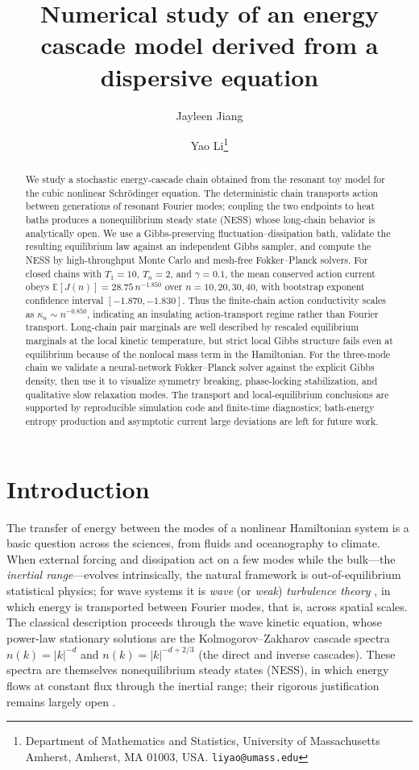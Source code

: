 \documentclass[11pt,a4paper]{article}
\title{Numerical study of an energy cascade model derived from a dispersive equation}
\author{Jayleen Jiang \and Yao Li\thanks{Department of Mathematics and Statistics, University of Massachusetts Amherst, Amherst, MA 01003, USA. \texttt{liyao@umass.edu}}}
\date{}
\theoremstyle{definition}
\newcommand{\E}{\mathbb{E}}
\numberwithin{equation}{section}   %
\begin{document}
\maketitle

\begin{abstract}
We study a stochastic energy-cascade chain obtained from the resonant toy model
for the cubic nonlinear Schr\"odinger equation. The deterministic chain
transports action between generations of resonant Fourier modes; coupling the
two endpoints to heat baths produces a nonequilibrium steady state (NESS) whose
long-chain behavior is analytically open. We use a Gibbs-preserving
fluctuation--dissipation bath, validate the resulting equilibrium law against
an independent Gibbs sampler, and compute the NESS by high-throughput Monte
Carlo and mesh-free Fokker--Planck solvers. For closed chains with
$T_1=10$, $T_n=2$, and $\gamma=0.1$, the mean conserved action current obeys
$\E[J(n)]=28.75\,n^{-1.850}$ over $n=10,20,30,40$, with bootstrap exponent
confidence interval $[-1.870,-1.830]$. Thus the finite-chain action
conductivity scales as $\kappa_n\sim n^{-0.850}$, indicating an insulating
action-transport regime rather than Fourier transport. Long-chain pair
marginals are well described by rescaled equilibrium marginals at the local
kinetic temperature, but strict local Gibbs structure fails even at
equilibrium because of the nonlocal mass term in the Hamiltonian. For the
three-mode chain we validate a neural-network Fokker--Planck solver against the
explicit Gibbs density, then use it to visualize symmetry breaking,
phase-locking stabilization, and qualitative slow relaxation modes. The
transport and local-equilibrium conclusions are supported by reproducible
simulation code and finite-time diagnostics; bath-energy entropy production and
asymptotic current large deviations are left for future work.
\end{abstract}


\section{Introduction}

The transfer of energy between the modes of a nonlinear Hamiltonian system is a
basic question across the sciences, from fluids and oceanography to climate.
When external forcing and dissipation act on a few modes while the bulk---the
\emph{inertial range}---evolves intrinsically, the natural framework is
out-of-equilibrium statistical physics; for wave systems it is \emph{wave} (or
\emph{weak}) \emph{turbulence theory} \cite{Nazarenko}, in which energy is
transported between Fourier modes, that is, across spatial scales. The classical
description proceeds through the wave kinetic equation, whose power-law
stationary solutions are the Kolmogorov--Zakharov cascade spectra
$n(k)=|k|^{-d}$ and $n(k)=|k|^{-d+2/3}$ (the direct and inverse cascades). These
spectra are themselves nonequilibrium steady states (NESS), in which energy
flows at constant flux through the inertial range; their rigorous justification
remains largely open \cite{HLNS}.
\end{document}
